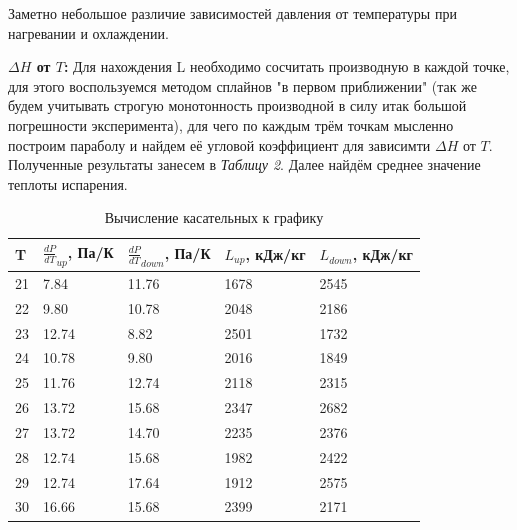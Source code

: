 Заметно небольшое различие зависимостей давления от температуры при нагревании и охлаждении. \\

\newpage

\textbf{$\Delta H$ от $T$:} Для нахождения L необходимо сосчитать производную в каждой точке, для этого воспользуемся методом сплайнов "в первом приближении" (так же будем учитывать строгую монотонность производной в силу итак большой погрешности эксперимента), для чего по каждым трём точкам мысленно построим параболу и найдем её угловой коэффициент для зависимти $\Delta H$ от $T$. Полученные результаты занесем в \textit{Таблицу 2}. Далее найдём среднее значение теплоты испарения. \\

\begin{table}[h!]
\centering
\caption{Вычисление касательных к графику}
\begin{tabular}{|l|l|l|l|l|}
\hline
T  & $\frac{dP}{dT}_{up}$, Па/К & $\frac{dP}{dT}_{down}$, Па/К & $L_{up}$, кДж/кг & $L_{down}$, кДж/кг \\ \hline
21 & 7.84                       & 11.76                        & 1678             & 2545               \\ \hline
22 & 9.80                       & 10.78                        & 2048             & 2186               \\ \hline
23 & 12.74                      & 8.82                         & 2501             & 1732               \\ \hline
24 & 10.78                      & 9.80                         & 2016             & 1849               \\ \hline
25 & 11.76                      & 12.74                        & 2118             & 2315               \\ \hline
26 & 13.72                      & 15.68                        & 2347             & 2682               \\ \hline
27 & 13.72                      & 14.70                        & 2235             & 2376               \\ \hline
28 & 12.74                      & 15.68                        & 1982             & 2422               \\ \hline
29 & 12.74                      & 17.64                        & 1912             & 2575               \\ \hline
30 & 16.66                      & 15.68                        & 2399             & 2171               \\ \hline

\end{tabular}
\end{table}
